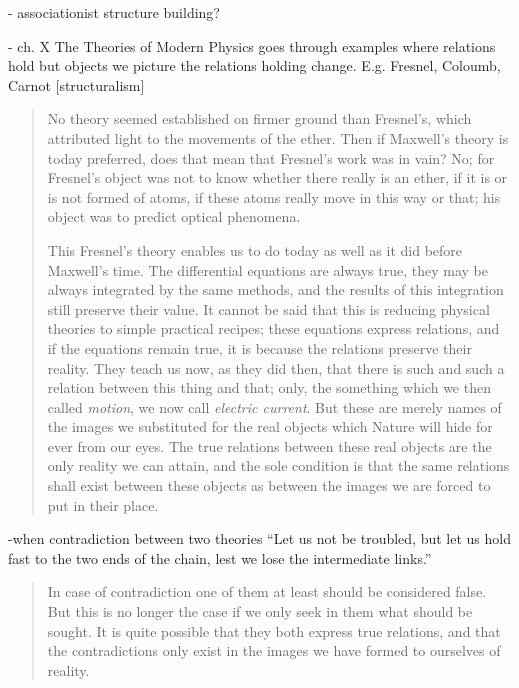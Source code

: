\documentclass{article}
\begin{document}
 - associationist structure building?
 
 - ch. X The Theories of Modern Physics goes through examples where relations hold but objects we picture the relations holding change.  E.g. Fresnel, Coloumb, Carnot [structuralism]
 
 \begin{quote}
     No theory seemed established on firmer ground than Fresnel's, which attributed light to the movements of the ether.  Then if Maxwell's theory is today preferred, does that mean that Fresnel's work was in vain?  No; for Fresnel's object was not to know whether there really is an ether, if it is or is not formed of atoms, if these atoms really move in this way or that; his object was to predict optical phenomena.
     
     This Fresnel's theory enables us to do today as well as it did before Maxwell's time.  The differential equations are always true, they may be always integrated by the same methods, and the results of this integration still preserve their value.  It cannot be said that this is reducing physical theories to simple practical recipes; these equations express relations, and if the equations remain true, it is because the relations preserve their reality.  They teach us now, as they did then, that there is such and such a relation between this thing and that; only, the something which we then called \emph{motion}, we now call \emph{electric current}.  But these are merely names of the images we substituted for the real objects which Nature will hide for ever from our eyes.  The true relations between these real objects are the only reality we can attain, and the sole condition is that the same relations shall exist between these objects as between the images we are forced to put in their place.  \citep[p. 160-161]{Poincare1952}
 \end{quote}
 
 -when contradiction between two theories ``Let us not be troubled, but let us hold fast to the two ends of the chain, lest we lose the intermediate links.''
 
 \begin{quote}
     In case of contradiction one of them at least should be considered false.  But this is no longer the case if we only seek in them what should be sought.  It is quite possible that they both express true relations, and that the contradictions only exist in the images we have formed to ourselves of reality.  \citep[p. 163]{Poincare1952}
 \end{quote}
 
\end{document}
